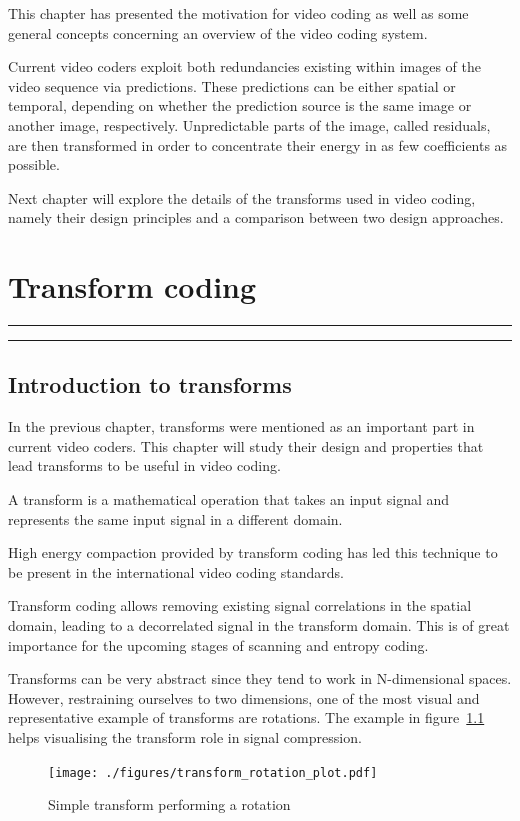 \documentclass[11pt,a4paper,openright,twoside]{book}
\providecommand{\chaptertoc}{
	\startcontents[chapters]
	\hrule
	\vspace{1em}
	\printcontents[chapters]{}{1}{{\bf\large Contents}}
	\hrule
}
\numberwithin{equation}{section} %
\begin{document}
This chapter has presented the motivation for video coding as well as
some general concepts concerning an overview of the video coding system.

Current video coders exploit both redundancies existing within images of
the video sequence via predictions.
These predictions can be either spatial or temporal, depending on
whether the prediction source is the same image or another image,
respectively.
Unpredictable parts of the image, called residuals, are then transformed
in order to concentrate their energy in as few coefficients as possible.

Next chapter will explore the details of the transforms used in video
coding, namely their design principles and a comparison between two
design approaches.

\chapter{Transform coding}
\label{cha:transform_coding}
\chaptertoc

\section{Introduction to transforms}
\label{sec:introduction_to_transforms}

In the previous chapter, transforms were mentioned as an important part
in current video coders.
This chapter will study their design and properties that lead transforms
to be useful in video coding.

A transform is a mathematical operation that takes an input signal and
represents the same input signal in a different domain.

High energy compaction provided by transform coding has led this
technique to be present in the international video coding standards.

Transform coding allows removing existing signal correlations in the
spatial domain, leading to a decorrelated signal in the transform
domain.
This is of great importance for the upcoming stages of scanning and
entropy coding.

Transforms can be very abstract since they tend to work in N-dimensional
spaces.
However, restraining ourselves to two dimensions, one of the most visual
and representative example of transforms are rotations.
The example in figure~\ref{fig:transform_rotation} helps visualising the
transform role in signal compression.

\begin{figure}[tb]
	\centering
	\texttt{[image: ./figures/transform\_rotation\_plot.pdf]}
	\caption{Simple transform performing a rotation}
	\label{fig:transform_rotation}
\end{figure}
\end{document}
